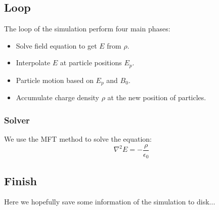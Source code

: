 \subsection{Loop}

The loop of the simulation perform four main phases:

\begin{itemize}
\item Solve field equation to get $E$ from $\rho$.
\item Interpolate $E$ at particle positions $E_p$.
\item Particle motion based on $E_p$ and $B_0$.
\item Accumulate charge density $\rho$ at the new position of particles.
\end{itemize}

\subsubsection{Solver}

We use the MFT method to solve the equation:
\begin{equation}
\nabla^2 E = - \frac{\rho}{\epsilon_0}
\end{equation}

\subsection{Finish}

Here we hopefully save some information of the simulation to disk...
